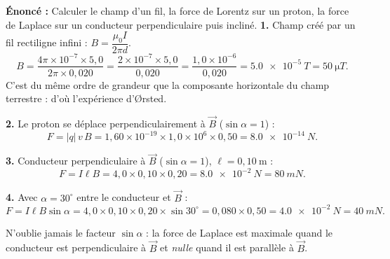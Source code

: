 \documentclass[11pt]{article}
\begin{document}
\begin{corrige}
\textbf{Énoncé :} Calculer le champ d'un fil, la force de Lorentz sur un proton, la force de Laplace sur un conducteur perpendiculaire puis incliné.
\tcblower
\textbf{1.} Champ créé par un fil rectiligne infini : $B = \dfrac{\mu_0 I}{2\pi d}$.
\[ B = \frac{4\pi \times 10^{-7} \times 5{,}0}{2\pi \times 0{,}020} = \frac{2 \times 10^{-7} \times 5{,}0}{0{,}020} = \frac{1{,}0 \times 10^{-6}}{0{,}020} = \SI{5,0e-5}{T} = \SI{50}{\micro T}. \]
C'est du même ordre de grandeur que la composante horizontale du champ terrestre : d'où l'expérience d'Ørsted.

\textbf{2.} Le proton se déplace perpendiculairement à $\vec{B}$ ($\sin\alpha = 1$) :
\[ F = |q|\,v\,B = 1{,}60\times 10^{-19} \times 1{,}0\times 10^{6} \times 0{,}50 = \SI{8,0e-14}{N}. \]

\textbf{3.} Conducteur perpendiculaire à $\vec{B}$ ($\sin\alpha = 1$), $\ell = 0{,}10\ \mathrm{m}$ :
\[ F = I\ell B = 4{,}0 \times 0{,}10 \times 0{,}20 = \SI{8,0e-2}{N} = \SI{80}{mN}. \]

\textbf{4.} Avec $\alpha = 30^{\circ}$ entre le conducteur et $\vec{B}$ :
\[ F = I\ell B \sin\alpha = 4{,}0 \times 0{,}10 \times 0{,}20 \times \sin 30^{\circ} = 0{,}080 \times 0{,}50 = \SI{4,0e-2}{N} = \SI{40}{mN}. \]
\begin{attention}
N'oublie jamais le facteur $\sin\alpha$ : la force de Laplace est maximale quand le conducteur est perpendiculaire à $\vec{B}$ et \emph{nulle} quand il est parallèle à $\vec{B}$.
\end{attention}
\end{corrige}
\end{document}
